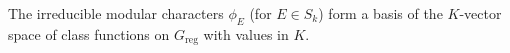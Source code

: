 The irreducible modular characters $\phi_E$ (for $E \in S_k$) form a basis of the $K$-vector space of class functions on $G_{\text{reg}}$ with values in $K$.
